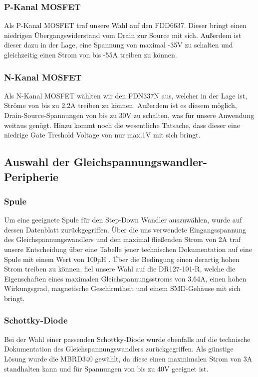 \subsubsection{P-Kanal MOSFET}

Als P-Kanal MOSFET traf unsere Wahl auf den FDD6637.
Dieser bringt einen niedrigen Übergangswiderstand vom Drain zur Source mit sich.
Außerdem ist dieser dazu in der Lage, eine Spannung von maximal -35V zu schalten und gleichzeitig einen Strom von bis -55A treiben zu können.

\subsubsection{N-Kanal MOSFET}

Als N-Kanal MOSFET wählten wir den FDN337N aus, welcher in der Lage ist, Ströme von bis zu 2.2A treiben zu können.
Außerdem ist es diesem möglich, Drain-Source-Spannungen von bis zu 30V zu schalten, was für unsere Anwendung weitaus genügt.
Hinzu kommt noch die wesentliche Tatsache, dass dieser eine niedrige Gate Treshold Voltage von nur max.1V mit sich bringt.

\subsection{Auswahl der Gleichspannungswandler-Peripherie}

\subsubsection{Spule}
Um eine geeignete Spule für den Step-Down Wandler auszuwählen, wurde auf dessen Datenblatt zurückgegriffen.
Über die uns verwendete Eingangsspannung des Gleichspannungswandlers und den maximal fließenden Strom von 2A
traf unsere Entscheidung über eine Tabelle jener technischen Dokumentation auf eine Spule mit einem Wert von 100µH .
Über die Bedingung einen derartig hohen Strom treiben zu können, fiel unsere Wahl auf die DR127-101-R,
welche die Eigenschaften eines maximalen Gleichspannungsstroms von 3.64A, einen hohen Wirkungsgrad, magnetische Geschirmtheit und einem SMD-Gehäuse mit sich bringt.

\subsubsection{Schottky-Diode}
Bei der Wahl einer passenden Schottky-Diode wurde ebenfalls auf die technische Dokumentation des Gleichspannungswandlers zurückgegriffen.
Als günstige Lösung wurde die MBRD340 gewählt, da diese einen maxmimalen Strom von 3A standhalten kann und für Spannungen von bis zu 40V geeignet ist.

